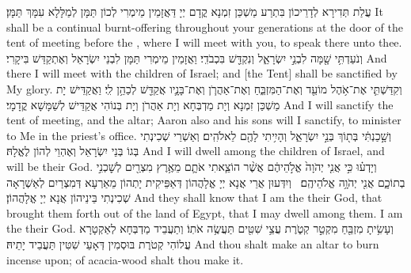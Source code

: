 {עֲלַת תְּדִירָא לְדָרֵיכוֹן בִּתְרַע מַשְׁכַּן זִמְנָא קֳדָם יְיָ דַּאֲזָמֵין מֵימְרִי לְכוֹן תַּמָּן לְמַלָּלָא עִמָּךְ תַּמָּן׃}
{It shall be a continual burnt-offering throughout your generations at the door of the tent of meeting before the \lord, where I will meet with you, to speak there unto thee.}{}
{וְנֹעַדְתִּ֥י שָׁ֖מָּה לִבְנֵ֣י יִשְׂרָאֵ֑ל וְנִקְדַּ֖שׁ בִּכְבֹדִֽי׃
}
{וַאֲזָמֵין מֵימְרִי תַּמָּן לִבְנֵי יִשְׂרָאֵל וְאֶתְקַדַּשׁ בִּיקָרִי׃}
{And there I will meet with the children of Israel; and [the Tent] shall be sanctified by My glory.}{}
{וְקִדַּשְׁתִּ֛י אֶת־אֹ֥הֶל מוֹעֵ֖ד וְאֶת־הַמִּזְבֵּ֑חַ וְאֶת־אַהֲרֹ֧ן וְאֶת־בָּנָ֛יו אֲקַדֵּ֖שׁ לְכַהֵ֥ן לִֽי׃}
{וַאֲקַדֵּישׁ יָת מַשְׁכַּן זִמְנָא וְיָת מַדְבְּחָא וְיָת אַהֲרֹן וְיָת בְּנוֹהִי אֲקַדֵּישׁ לְשַׁמָּשָׁא קֳדָמָי׃}
{And I will sanctify the tent of meeting, and the altar; Aaron also and his sons will I sanctify, to minister to Me in the priest’s office.}{}
{וְשָׁ֣כַנְתִּ֔י בְּת֖וֹךְ בְּנֵ֣י יִשְׂרָאֵ֑ל וְהָיִ֥יתִי לָהֶ֖ם לֵאלֹהִֽים׃}
{וְאַשְׁרֵי שְׁכִינְתִי בְּגוֹ בְּנֵי יִשְׂרָאֵל וְאֶהְוֵי לְהוֹן לֶאֱלָהּ׃}
{And I will dwell among the children of Israel, and will be their God.}{}
{וְיָדְע֗וּ כִּ֣י אֲנִ֤י יְהֹוָה֙ אֱלֹ֣הֵיהֶ֔ם אֲשֶׁ֨ר הוֹצֵ֧אתִי אֹתָ֛ם מֵאֶ֥רֶץ מִצְרַ֖יִם לְשׇׁכְנִ֣י בְתוֹכָ֑ם אֲנִ֖י יְהֹוָ֥ה אֱלֹהֵיהֶֽם׃ \petucha 
{}}
{וְיִדְּעוּן אֲרֵי אֲנָא יְיָ אֱלָהֲהוֹן דְּאַפֵּיקִית יָתְהוֹן מֵאַרְעָא דְּמִצְרַיִם לְאַשְׁרָאָה שְׁכִינְתִי בֵּינֵיהוֹן אֲנָא יְיָ אֱלָהֲהוֹן׃}
{And they shall know that I am the \lord\space their God, that brought them forth out of the land of Egypt, that I may dwell among them. I am the \lord\space their God.}{}
\newperek
{}%
{וְעָשִׂ֥יתָ מִזְבֵּ֖חַ מִקְטַ֣ר קְטֹ֑רֶת עֲצֵ֥י שִׁטִּ֖ים תַּעֲשֶׂ֥ה אֹתֽוֹ׃
}
{וְתַעֲבֵיד מַדְבְּחָא לְאַקְטָרָא עֲלוֹהִי קְטֹרֶת בּוּסְמִין דְּאָעֵי שִׁטִּין תַּעֲבֵיד יָתֵיהּ׃}
{And thou shalt make an altar to burn incense upon; of acacia-wood shalt thou make it.}{}
